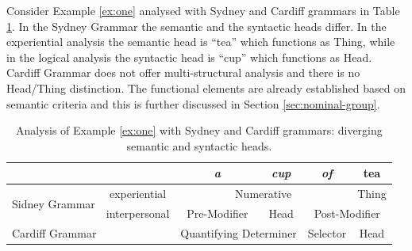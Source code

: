 %
%

Consider Example \ref{ex:one} analysed with Sydney and Cardiff grammars in Table \ref{tab:the-head-differences}. In the Sydney Grammar the semantic and the syntactic heads differ. In the experiential analysis the semantic head is ``tea'' which functions as Thing, while in the logical analysis the syntactic head is ``cup'' which functions as Head. Cardiff Grammar does not offer multi-structural analysis and there is no Head/Thing distinction. The functional elements are already established based on semantic criteria and this is further discussed in Section \ref{sec:nominal-group}. 

\begin{table}[!ht]
	\centering
	\begin{tabular}{|c|c|c|c|c|c|}
        \hline
        \multicolumn{2}{|c|}{\textit{}}                 & \textit{a}           & \textit{cup}         & \textit{of}         & tea          \\ \hline
        \multirow{2}{*}{Sidney Grammar} & experiential  & \multicolumn{3}{c|}{Numerative}                                   & Thing        \\ \cline{2-6} 
        & interpersonal & Pre-Modifier         & Head                 & \multicolumn{2}{c|}{Post-Modifier} \\ \hline
        \multicolumn{2}{|l|}{Cardiff Grammar}           & \multicolumn{2}{c|}{Quantifying Determiner} & Selector            & Head         \\ \hline
    \end{tabular}
	\caption{Analysis of Example \ref{ex:one} with Sydney and Cardiff grammars: diverging semantic and syntactic heads.}
	\label{tab:the-head-differences}
\end{table}

